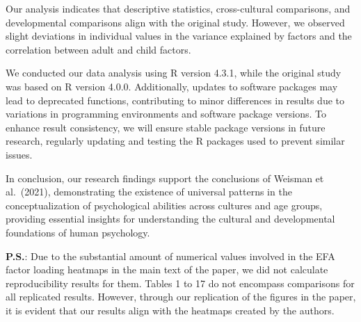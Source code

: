 \documentclass[
  man]{apa6}
\begin{document}
Our analysis indicates that descriptive statistics, cross-cultural comparisons, and developmental comparisons align with the original study. However, we observed slight deviations in individual values in the variance explained by factors and the correlation between adult and child factors.

We conducted our data analysis using R version 4.3.1, while the original study was based on R version 4.0.0. Additionally, updates to software packages may lead to deprecated functions, contributing to minor differences in results due to variations in programming environments and software package versions. To enhance result consistency, we will ensure stable package versions in future research, regularly updating and testing the R packages used to prevent similar issues.

In conclusion, our research findings support the conclusions of Weisman et al.~(2021), demonstrating the existence of universal patterns in the conceptualization of psychological abilities across cultures and age groups, providing essential insights for understanding the cultural and developmental foundations of human psychology.

\textbf{P.S.}: Due to the substantial amount of numerical values involved in the EFA factor loading heatmaps in the main text of the paper, we did not calculate reproducibility results for them. Tables 1 to 17 do not encompass comparisons for all replicated results. However, through our replication of the figures in the paper, it is evident that our results align with the heatmaps created by the authors.
\end{document}
